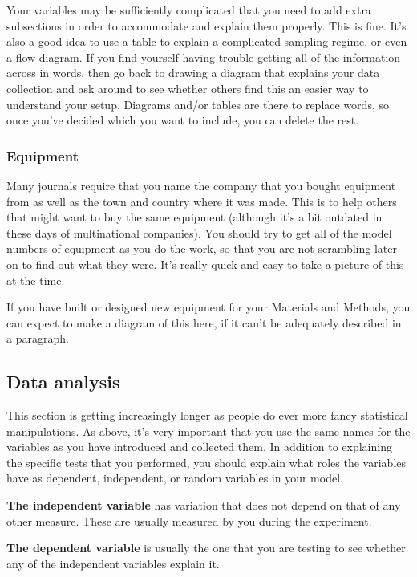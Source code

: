 \documentclass[
]{krantz}
\begin{document}
Your variables may be sufficiently complicated that you need to add extra subsections in order to accommodate and explain them properly. This is fine. It's also a good idea to use a table to explain a complicated sampling regime, or even a flow diagram. If you find yourself having trouble getting all of the information across in words, then go back to drawing a diagram that explains your data collection and ask around to see whether others find this an easier way to understand your setup. Diagrams and/or tables are there to replace words, so once you've decided which you want to include, you can delete the rest.

\hypertarget{equipment}{%
\subsubsection{Equipment}\label{equipment}}

Many journals require that you name the company that you bought equipment from as well as the town and country where it was made. This is to help others that might want to buy the same equipment (although it's a bit outdated in these days of multinational companies). You should try to get all of the model numbers of equipment as you do the work, so that you are not scrambling later on to find out what they were. It's really quick and easy to take a picture of this at the time.

If you have built or designed new equipment for your Materials and Methods, you can expect to make a diagram of this here, if it can't be adequately described in a paragraph.

\hypertarget{data-analysis}{%
\subsection{Data analysis}\label{data-analysis}}

This section is getting increasingly longer as people do ever more fancy statistical manipulations. As above, it's very important that you use the same names for the variables as you have introduced and collected them. In addition to explaining the specific tests that you performed, you should explain what roles the variables have as dependent, independent, or random variables in your model.

\textbf{The independent variable} has variation that does not depend on that of any other measure. These are usually measured by you during the experiment.

\textbf{The dependent variable} is usually the one that you are testing to see whether any of the independent variables explain it.
\end{document}
